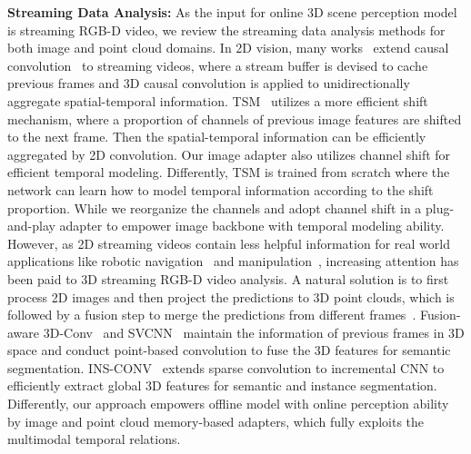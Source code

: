 \textbf{Streaming Data Analysis:}
As the input for online 3D scene perception model is streaming RGB-D video, we review the streaming data analysis methods for both image and point cloud domains.
In 2D vision, many works~\cite{carreira2018massively,dai2019transformer,kondratyuk2021movinets} extend causal convolution~\cite{oord2016wavenet} to streaming videos, where a stream buffer is devised to cache previous frames and 3D causal convolution is applied to unidirectionally aggregate spatial-temporal information. 
TSM~\cite{lin2019tsm} utilizes a more efficient shift mechanism, where a proportion of channels of previous image features are shifted to the next frame. Then the spatial-temporal information can be efficiently aggregated by 2D convolution. Our image adapter also utilizes channel shift for efficient temporal modeling. Differently, TSM is trained from scratch where the network can learn how to model temporal information according to the shift proportion. While we reorganize the channels and adopt channel shift in a plug-and-play adapter to empower image backbone with temporal modeling ability.
However, as 2D streaming videos contain less helpful information for real world applications like robotic navigation~\cite{chaplot2020object,zhang20233d} and manipulation~\cite{Mousavian_2019_ICCV}, increasing attention has been paid to 3D streaming RGB-D video analysis.
A natural solution is to first process 2D images and then project the predictions to 3D point clouds, which is followed by a fusion step to merge the predictions from different frames~\cite{mccormac2017semanticfusion,narita2019panopticfusion}.
Fusion-aware 3D-Conv~\cite{zhang2020fusion} and SVCNN~\cite{huang2021supervoxel} maintain the information of previous frames in 3D space and conduct point-based convolution to fuse the 3D features for semantic segmentation. INS-CONV~\cite{liu2022ins} extends sparse convolution to incremental CNN to efficiently extract global 3D features for semantic and instance segmentation.
Differently, our approach empowers offline model with online perception ability by image and point cloud memory-based adapters, which fully exploits the multimodal temporal relations.